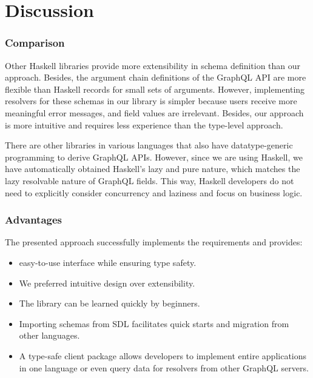 \section{Discussion}


\begin{frame}\frametitle{Comparison}

    Other Haskell libraries provide more extensibility in schema definition than our approach. Besides, the argument chain definitions of the GraphQL API are more flexible than Haskell records for small sets of arguments. However, implementing resolvers for these schemas in our library is simpler because users receive more meaningful error messages, and field values are irrelevant. Besides, our approach is more intuitive and requires less experience than the type-level approach.
    
    There are other libraries in various languages that also have datatype-generic programming to derive GraphQL APIs. However, since we are using Haskell, we have automatically obtained Haskell's lazy and pure nature, which matches the lazy resolvable nature of GraphQL fields. This way, Haskell developers do not need to explicitly consider concurrency and laziness and focus on business logic. 
\end{frame}
    
\begin{frame}\frametitle{Advantages}

The presented approach successfully implements the requirements and provides:

\begin{itemize}
    \item easy-to-use interface while ensuring type safety.
    \item We preferred intuitive design over extensibility.
    \item The library can be learned quickly by beginners.
    \item Importing schemas from SDL facilitates quick starts and migration from other languages.
    \item A type-safe client package allows developers to implement entire applications in one language or even query data for resolvers from other GraphQL servers.
\end{itemize}

\end{frame}

